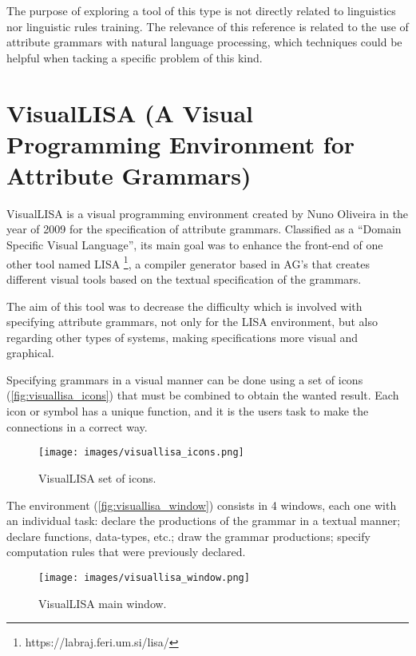 The purpose of exploring a tool of this type is not directly related to linguistics nor linguistic rules training.
The relevance of this reference is related to the use of attribute grammars with natural language processing, which techniques could be helpful when tacking a specific problem of this kind.


\section{VisualLISA (A Visual Programming Environment for Attribute Grammars)}
VisualLISA is a visual programming environment created by Nuno Oliveira in the year of 2009 \cite{oliveira_2009} for the specification of attribute grammars. 
Classified as a ``Domain Specific  Visual Language'', its main goal was to enhance the front-end of one other tool named LISA \footnote{https://labraj.feri.um.si/lisa/}, 
a compiler generator based in AG's that creates different visual tools based on the textual specification of the grammars.
    
The aim of this tool was to decrease the difficulty which is involved with specifying attribute grammars, not only for the LISA environment, but also regarding other types of systems, 
making specifications more visual and graphical.
    
Specifying grammars in a visual manner can be done using a set of icons (\autoref{fig:visuallisa_icons}) that must be combined to obtain the wanted result. 
Each icon or symbol has a unique function, and it is the users task to make the connections in a correct way.
    
\begin{figure}[h]
    \centering
    \texttt{[image: images/visuallisa\_icons.png]}
    \caption{VisualLISA set of icons.}
    \label{fig:visuallisa_icons}
\end{figure}

\newpage
The environment (\autoref{fig:visuallisa_window}) consists in 4 windows, each one with an individual task: 
declare the productions of the grammar in a textual manner; 
declare functions, data-types, etc.; 
draw the grammar productions; 
specify computation rules that were previously declared.
    
\begin{figure}[h]
    \centering
    \texttt{[image: images/visuallisa\_window.png]}
    \caption{VisualLISA main window.}
    \label{fig:visuallisa_window}
\end{figure}
    
